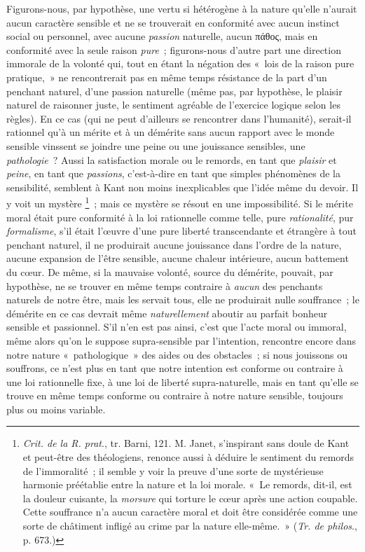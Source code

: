 \documentclass[french,twoside]{book} %
\begin{document}
Figurons-nous, par hypothèse, une vertu si hétérogène à la nature qu’elle n’aurait aucun caractère sensible et ne se trouverait en conformité avec aucun instinct social ou personnel, avec aucune \emph{passion} naturelle, aucun πάθος, mais en conformité avec la seule raison \emph{pure} ; figurons-nous d’autre part une direction immorale de la volonté qui, tout en étant la négation des « lois de la raison pure pratique, » ne rencontrerait pas en même temps résistance de la part d’un penchant naturel, d’une passion naturelle (même pas, par hypothèse, le plaisir naturel de raisonner juste, le sentiment agréable de l’exercice logique selon les règles). En ce cas (qui ne peut d’ailleurs se rencontrer dans l’humanité), serait-il rationnel qu’à un mérite et à un démérite sans aucun rapport avec le monde sensible vinssent se joindre une peine ou une jouissance sensibles, une \emph{pathologie} ? Aussi la satisfaction morale ou le remords, en tant que \emph{plaisir} et \emph{peine}, en tant que \emph{passions}, c’est-à-dire en tant que simples phénomènes de la sensibilité, semblent à Kant non moins inexplicables que l’idée même du devoir. Il y voit un mystère \footnote{\emph{Crit. de la R. prat}., tr. Barni, 121. M. Janet, s’inspirant sans doule de Kant et peut-être des théologiens, renonce aussi à déduire le sentiment du remords de l’immoralité ; il semble y voir la preuve d’une sorte de mystérieuse harmonie préétablie entre la nature et la loi morale. « Le remords, dit-il, est la douleur cuisante, la \emph{morsure} qui torture le cœur après une action coupable. Cette souffrance n’a aucun caractère moral et doit être considérée comme une sorte de châtiment infligé au crime par la nature elle-même. » (\emph{Tr. de philos}., p. 673.)} ; mais ce mystère se résout en une impossibilité. Si le mérite moral était pure conformité à la loi rationnelle comme telle, pure \emph{rationalité}, pur \emph{formalisme}, s’il était l’œuvre d’une pure liberté transcendante et étrangère à tout penchant naturel, il ne produirait aucune jouissance dans l’ordre de la nature, aucune expansion de l’être sensible, aucune chaleur intérieure, aucun battement du cœur. De même, si la mauvaise volonté, source du démérite, pouvait, par hypothèse, ne se trouver en même temps contraire à \emph{aucun} des penchants naturels de notre être, mais les servait tous, elle ne produirait nulle souffrance ; le démérite en ce cas devrait même \emph{naturellement} aboutir au parfait bonheur sensible et passionnel. S’il n’en est pas ainsi, c’est que l’acte moral ou immoral, même alors qu’on le suppose supra-sensible par l’intention, rencontre encore dans notre nature « pathologique » des aides ou des obstacles ; si nous jouissons ou souffrons, ce n’est plus en tant que notre intention est conforme ou contraire à une loi rationnelle fixe, à une loi de liberté supra-naturelle, mais en tant qu’elle se trouve en même temps conforme ou contraire à notre nature sensible, toujours plus ou moins variable.\par
\end{document}
